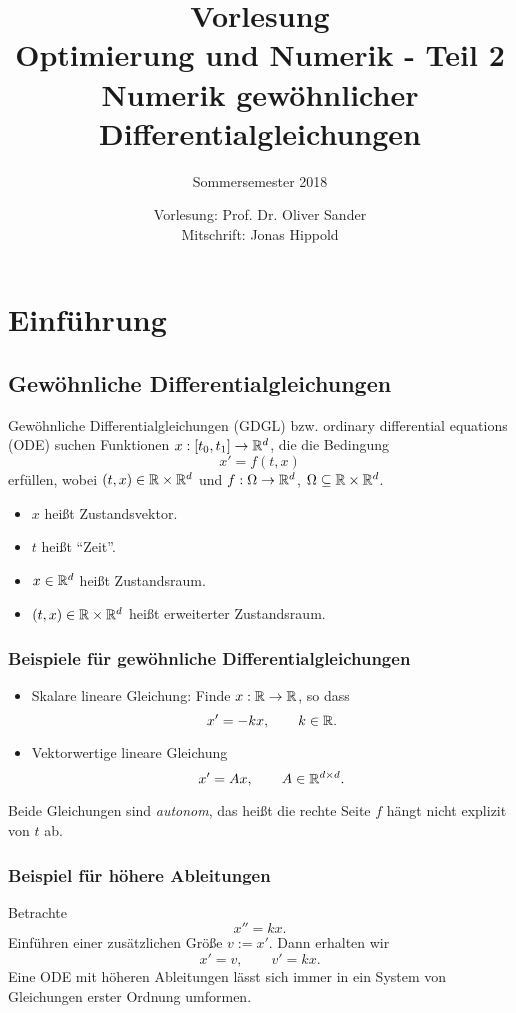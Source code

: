 \documentclass[
 a4paper,
 12pt,
 parskip=half
 ]{scrreprt}
\title{%
  Vorlesung\\
  Optimierung und Numerik - Teil 2\\
  Numerik gewöhnlicher Differentialgleichungen}
\subtitle{Sommersemester 2018}
\author{Vorlesung: Prof. Dr. Oliver Sander\\Mitschrift: Jonas Hippold}
\theoremstyle{plain}
\theoremstyle{definition}
\numberwithin{rmrk}{chapter}
\numberwithin{defn}{chapter}
\numberwithin{exmp}{chapter}
\numberwithin{prgp}{subsection}
\numberwithin{equation}{chapter}
\begin{document}
\maketitle

\tableofcontents

\clearpage

\chapter{Einführung}
\section{Gewöhnliche Differentialgleichungen}
Gewöhnliche Differentialgleichungen (GDGL) bzw. ordinary differential
equations (ODE) suchen Funktionen $x : [t_0, t_1] \to \mathbb{R}^d$, die die
Bedingung 
\[ x' = f(t,x) \]
erfüllen, wobei $(t,x) \in \mathbb{R} \times \mathbb{R}^d$ und $f: \Omega \to \mathbb{R}^d$,
$\Omega \subseteq \mathbb{R} \times \mathbb{R}^d$.
\begin{itemize}
\item $x$ heißt Zustandsvektor.
\item $t$ heißt ``Zeit''.
\item $x \in \mathbb{R}^d$ heißt Zustandsraum.
\item $(t,x) \in \mathbb{R} \times \mathbb{R}^d$ heißt erweiterter Zustandsraum.
\end{itemize}

\subsection{Beispiele für gewöhnliche Differentialgleichungen}
\begin{itemize}
\item Skalare lineare Gleichung: Finde $x : \mathbb{R} \to \mathbb{R}$, so dass
  \[ x' = -k x, \qquad k \in \mathbb{R}. \]
\item Vektorwertige lineare Gleichung
  \[ x' = Ax, \qquad A \in \mathbb{R}^{d \times d}. \]
\end{itemize}
Beide Gleichungen sind \emph{autonom}, das heißt die rechte Seite $f$ hängt
nicht explizit von $t$ ab.

\subsection{Beispiel für höhere Ableitungen}
Betrachte
\[ x'' = kx. \]
Einführen einer zusätzlichen Größe $v := x'$. Dann erhalten wir
\[ x' = v, \qquad v' = kx. \]
Eine ODE mit höheren Ableitungen lässt sich immer in ein System von Gleichungen
erster Ordnung umformen.
\end{document}

